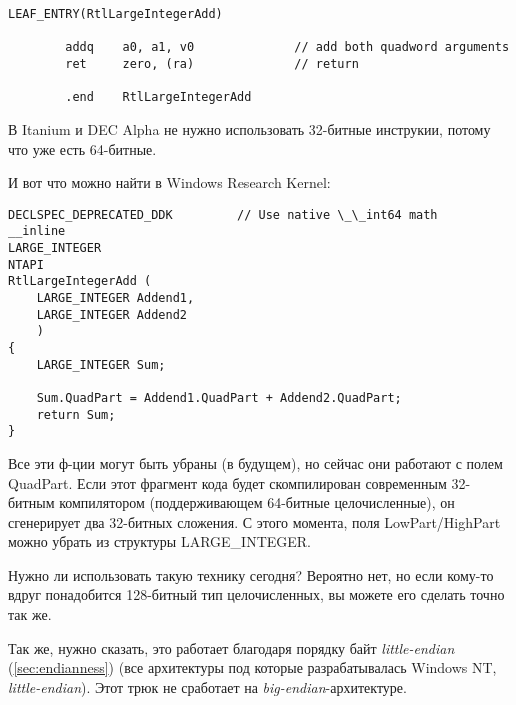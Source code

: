 \begin{lstlisting}[caption=Архитектура DEC Alpha]
        LEAF_ENTRY(RtlLargeIntegerAdd)

        addq    a0, a1, v0              // add both quadword arguments
        ret     zero, (ra)              // return

        .end    RtlLargeIntegerAdd
\end{lstlisting}

В Itanium и DEC Alpha не нужно использовать 32-битные инструкии, потому что уже есть 64-битные.

И вот что можно найти в Windows Research Kernel:

\begin{lstlisting}[style=customc]
DECLSPEC_DEPRECATED_DDK         // Use native \_\_int64 math
__inline
LARGE_INTEGER
NTAPI
RtlLargeIntegerAdd (
    LARGE_INTEGER Addend1,
    LARGE_INTEGER Addend2
    )
{
    LARGE_INTEGER Sum;

    Sum.QuadPart = Addend1.QuadPart + Addend2.QuadPart;
    return Sum;
}
\end{lstlisting}

Все эти ф-ции могут быть убраны (в будущем), но сейчас они работают с полем QuadPart.
Если этот фрагмент кода будет скомпилирован современным 32-битным компилятором (поддерживающем 64-битные целочисленные),
он сгенерирует два 32-битных сложения.
С этого момента, поля LowPart/HighPart можно убрать из структуры  LARGE\_INTEGER.

Нужно ли использовать такую технику сегодня?
Вероятно нет, но если кому-то вдруг понадобится 128-битный тип целочисленных, вы можете его сделать точно так же.

Так же, нужно сказать, это работает благодаря порядку байт \emph{little-endian} (\ref{sec:endianness})
(все архитектуры под которые разрабатывалась Windows NT, \emph{little-endian}).
Этот трюк не сработает на \emph{big-endian}-архитектуре.

